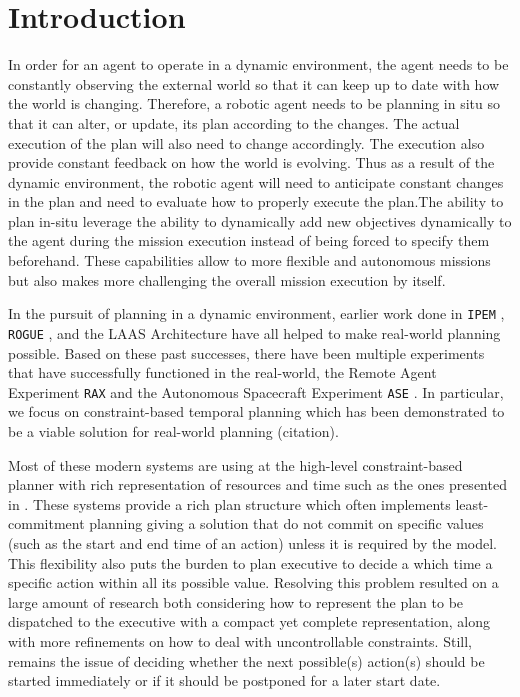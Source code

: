 \section{Introduction}
\label{sec:intro}



In order for an agent to operate in a dynamic environment, the agent
needs to be constantly observing the external world so that it can
keep up to date with how the world is changing. Therefore, a robotic
agent needs to be planning in situ so that it can alter, or update,
its plan according to the changes. The actual execution of the plan
will also need to change accordingly. The execution also provide
constant feedback on how the world is evolving.  Thus as a result of
the dynamic environment, the robotic agent will need to anticipate
constant changes in the plan and need to evaluate how to properly
execute the plan.The ability to plan in-situ leverage the ability to
dynamically add new objectives dynamically to the agent during the
mission execution instead of being forced to specify them beforehand.
These capabilities allow to more flexible and autonomous missions
but also makes more challenging the overall mission execution by itself. 


In the pursuit of planning in a dynamic environment, earlier work done
in \texttt{IPEM} \cite{AmbrosIngerson88}, \texttt{ROGUE}
\cite{Haigh98}, and the LAAS Architecture \cite{alami:1998p820} have
all helped to make real-world planning possible. Based on these past
successes, there have been multiple experiments that have successfully
functioned in the real-world, the Remote Agent Experiment \texttt{RAX}
\cite{mus98} and the Autonomous Spacecraft Experiment \texttt{ASE}
\cite{chien99}. In particular, we focus on constraint-based temporal
planning which has been demonstrated to be a viable solution for
real-world planning (citation).

Most of these modern systems are using at the high-level 
constraint-based planner with rich representation of resources 
and time such as the ones presented in \cite{frank2003,lemai04}. 
These systems provide a rich plan structure which often implements
least-commitment planning giving a solution that do not commit on
specific values (such as the start and end time of an action) unless it
is required by the model. This flexibility also puts the burden to
plan executive to decide a which time a specific action within all
its possible value. Resolving this problem resulted on a large amount
of research both considering how to represent the plan to be
dispatched to the executive with a compact yet complete
representation, along with more refinements on how to deal with
uncontrollable constraints. Still, remains the issue of deciding 
whether the next possible(s) action(s) should be started immediately 
or if it should be postponed for a later start date. 


